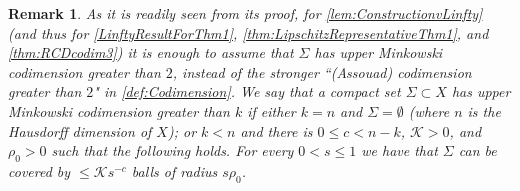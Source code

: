 \documentclass[12pt,a4paper,reqno]{amsart}
\newtheorem{remark}[theorem]{Remark}
\renewcommand{\leq}{\leqslant}
\begin{document}
\begin{remark}\label{rem:MinkowskiVsAssouad}
    As it is readily seen from its proof, for \cref{lem:ConstructionvLinfty} (and thus for \cref{LinftyResultForThm1}, \cref{thm:LipschitzRepresentativeThm1}, and \cref{thm:RCDcodim3}) it is enough to assume that $\Sigma$ has upper Minkowski codimension greater than $2$, instead of the stronger ``(Assouad) codimension greater than $2$" in \cref{def:Codimension}. We say that a compact set $\Sigma\subset X$ {\rm has 
    upper Minkowski codimension greater than $k$} if either $k=n$ and $\Sigma=\emptyset$ (where $n$ is the Hausdorff dimension of $X$); or $k<n$ and there is $0\leq c<n-k$, $\mathcal{K} > 0$, and $\rho_0>0$ such that the following holds. For every $0<s\leq 1$ we have that $\Sigma$ can be covered by $\leq \mathcal{K} s^{-c}$ balls of radius $s\rho_0$. 
\end{remark}
\end{document}
